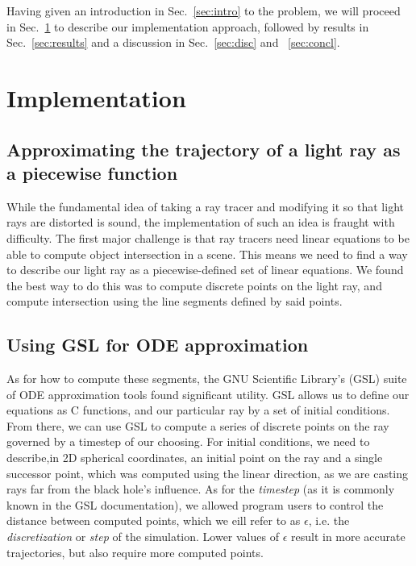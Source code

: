 

Having given an introduction in Sec.~\ref{sec:intro} to the problem, we will proceed in Sec.~\ref{sec:impl} to describe our implementation approach, followed by results in  Sec.~\ref{sec:results} and a discussion in Sec.~\ref{sec:disc} and ~\ref{sec:concl}.



\section{Implementation}
\label{sec:impl}


\subsection{Approximating the trajectory of a light ray as a piecewise function}
While the fundamental idea of taking a ray tracer and modifying it so that light rays are distorted is sound, the implementation of such an idea is fraught with difficulty. The first major challenge is that ray tracers need linear equations to be able to compute object intersection in a scene. This means we need to find a way to describe our light ray as a piecewise-defined set of linear equations. We found the best way to do this was to compute discrete points on the light ray, and compute intersection using the line segments defined by said points. 


\subsection{Using GSL for ODE approximation}
As for how to compute these segments, the GNU Scientific Library's (GSL) suite \cite{10.5555/1538674} of ODE approximation tools found significant utility. GSL allows us to define our equations as C functions, and our particular ray by a set of initial conditions. From there, we can use GSL to compute a series of discrete points on the ray governed by a timestep of our choosing. For initial conditions, we need to describe,in 2D spherical coordinates, an initial point on the ray and a single successor point, which was computed using the linear direction, as we are casting rays far from the black hole's influence. As for the \textit{timestep} (as it is commonly known in the GSL documentation), we allowed program users to control the distance between computed points, which we eill refer to as $\epsilon$, i.e. the \textit{discretization} or \textit{step} of the simulation. Lower values of $\epsilon$ result in more accurate trajectories, but also require more computed points. 

